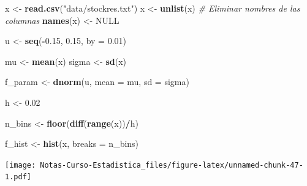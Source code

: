 \documentclass[
  12pt,
]{book}
\newenvironment{Shaded}{\begin{snugshade}}{\end{snugshade}}
\newcommand{\CommentTok}[1]{\textcolor[rgb]{0.56,0.35,0.01}{\textit{#1}}}
\newcommand{\DataTypeTok}[1]{\textcolor[rgb]{0.13,0.29,0.53}{#1}}
\newcommand{\FloatTok}[1]{\textcolor[rgb]{0.00,0.00,0.81}{#1}}
\newcommand{\KeywordTok}[1]{\textcolor[rgb]{0.13,0.29,0.53}{\textbf{#1}}}
\newcommand{\NormalTok}[1]{#1}
\newcommand{\OperatorTok}[1]{\textcolor[rgb]{0.81,0.36,0.00}{\textbf{#1}}}
\newcommand{\OtherTok}[1]{\textcolor[rgb]{0.56,0.35,0.01}{#1}}
\newcommand{\StringTok}[1]{\textcolor[rgb]{0.31,0.60,0.02}{#1}}
\theoremstyle{definition}
\theoremstyle{definition}
\theoremstyle{definition}
\theoremstyle{remark}
\begin{document}
\begin{Shaded}
\begin{Highlighting}[]
\NormalTok{x <-}\StringTok{ }\KeywordTok{read.csv}\NormalTok{(}\StringTok{"data/stockres.txt"}\NormalTok{)}
\NormalTok{x <-}\StringTok{ }\KeywordTok{unlist}\NormalTok{(x)}
\CommentTok{# Eliminar nombres de las columnas}
\KeywordTok{names}\NormalTok{(x) <-}\StringTok{ }\OtherTok{NULL}

\NormalTok{u <-}\StringTok{ }\KeywordTok{seq}\NormalTok{(}\OperatorTok{-}\FloatTok{0.15}\NormalTok{, }\FloatTok{0.15}\NormalTok{, }\DataTypeTok{by =} \FloatTok{0.01}\NormalTok{)}

\NormalTok{mu <-}\StringTok{ }\KeywordTok{mean}\NormalTok{(x)}
\NormalTok{sigma <-}\StringTok{ }\KeywordTok{sd}\NormalTok{(x)}

\NormalTok{f_param <-}\StringTok{ }\KeywordTok{dnorm}\NormalTok{(u, }\DataTypeTok{mean =}\NormalTok{ mu, }\DataTypeTok{sd =}\NormalTok{ sigma)}

\NormalTok{h <-}\StringTok{ }\FloatTok{0.02}

\NormalTok{n_bins <-}\StringTok{ }\KeywordTok{floor}\NormalTok{(}\KeywordTok{diff}\NormalTok{(}\KeywordTok{range}\NormalTok{(x))}\OperatorTok{/}\NormalTok{h)}

\NormalTok{f_hist <-}\StringTok{ }\KeywordTok{hist}\NormalTok{(x, }\DataTypeTok{breaks =}\NormalTok{ n_bins)}
\end{Highlighting}
\end{Shaded}

\texttt{[image: Notas-Curso-Estadistica\_files/figure-latex/unnamed-chunk-47-1.pdf]}
\end{document}
